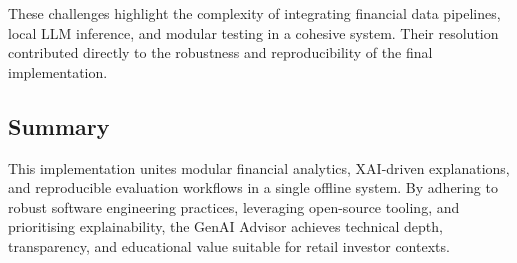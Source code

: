 These challenges highlight the complexity of integrating financial data pipelines, local LLM inference, and modular testing in a cohesive system. Their resolution contributed directly to the robustness and reproducibility of the final implementation.

\subsection{Summary}
This implementation unites modular financial analytics, XAI-driven explanations, and reproducible evaluation workflows in a single offline system. By adhering to robust software engineering practices, leveraging open-source tooling, and prioritising explainability, the GenAI Advisor achieves technical depth, transparency, and educational value suitable for retail investor contexts.
